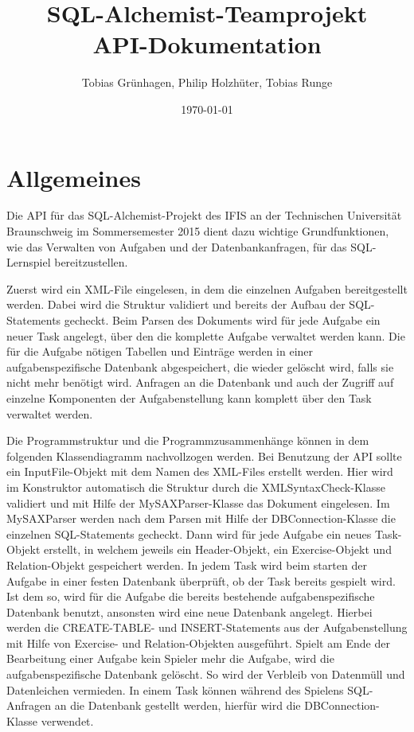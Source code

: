 \documentclass[11pt]{report}
\title{\textbf{SQL-Alchemist-Teamprojekt} \\ API-Dokumentation}
\author{Tobias Grünhagen, Philip Holzhüter, Tobias Runge}
\date{\today}
\begin{document}
\maketitle

\chapter{Allgemeines}

Die API für das SQL-Alchemist-Projekt des IFIS an der Technischen Universität Braunschweig im Sommersemester 2015 dient dazu wichtige Grundfunktionen, wie das Verwalten von Aufgaben und der Datenbankanfragen, für das SQL-Lernspiel bereitzustellen.

Zuerst wird ein XML-File eingelesen, in dem die einzelnen Aufgaben bereitgestellt werden. Dabei wird die Struktur validiert und bereits der Aufbau der SQL-Statements gecheckt. Beim Parsen des Dokuments wird für jede Aufgabe ein neuer Task angelegt, über den die komplette Aufgabe verwaltet werden kann. Die für die Aufgabe nötigen Tabellen und Einträge werden in einer aufgabenspezifische Datenbank abgespeichert, die wieder gelöscht wird, falls sie nicht mehr benötigt wird. Anfragen an die Datenbank und auch der Zugriff auf einzelne Komponenten der Aufgabenstellung kann komplett über den Task verwaltet werden.

Die Programmstruktur und die Programmzusammenhänge können in dem folgenden Klassendiagramm nachvollzogen werden. Bei Benutzung der API sollte ein InputFile-Objekt mit dem Namen des XML-Files erstellt werden. Hier wird im Konstruktor automatisch die Struktur durch die XMLSyntaxCheck-Klasse validiert und mit Hilfe der MySAXParser-Klasse das Dokument eingelesen. Im MySAXParser werden nach dem Parsen mit Hilfe der DBConnection-Klasse die einzelnen SQL-Statements gecheckt. Dann wird für jede Aufgabe ein neues Task-Objekt erstellt, in welchem jeweils ein Header-Objekt, ein Exercise-Objekt und Relation-Objekt gespeichert werden. In jedem Task wird beim starten der Aufgabe in einer festen Datenbank überprüft, ob der Task bereits gespielt wird. Ist dem so, wird für die Aufgabe die bereits bestehende aufgabenspezifische Datenbank benutzt, ansonsten wird eine neue Datenbank angelegt. Hierbei werden die CREATE-TABLE- und INSERT-Statements aus der Aufgabenstellung mit Hilfe von Exercise- und Relation-Objekten ausgeführt. Spielt am Ende der Bearbeitung einer Aufgabe kein Spieler mehr die Aufgabe, wird die aufgabenspezifische Datenbank gelöscht. So wird der Verbleib von Datenmüll und Datenleichen vermieden. In einem Task können während des Spielens SQL-Anfragen an die Datenbank gestellt werden, hierfür wird die DBConnection-Klasse verwendet.
\end{document}
